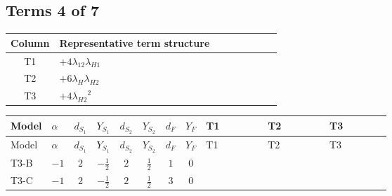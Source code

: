 \documentclass[8pt]{article}
\begin{document}
\begin{landscape}
\subsection*{Terms 4 of 7}
\begin{center}
\begin{tabular}{@{}c >{\raggedright\arraybackslash}p{0.82\linewidth}@{}}
\toprule
Column & Representative term structure \\
\midrule
T1 & \(\displaystyle +4 {\lambda_{12}} {\lambda_{H1}}\) \\
\midrule
T2 & \(\displaystyle +6 {\lambda_H} {\lambda_{H2}}\) \\
\midrule
T3 & \(\displaystyle +4 {\lambda_{H2}}^2\) \\
\midrule
\bottomrule
\end{tabular}
\end{center}
\smallskip
\tiny
\begin{longtable}{@{}llcccccc >{\raggedright\arraybackslash}p{0.21\linewidth} >{\raggedright\arraybackslash}p{0.21\linewidth} >{\raggedright\arraybackslash}p{0.21\linewidth}@{}}
\toprule
Model & $\alpha$ & $d_{S_1}$ & $Y_{S_1}$ & $d_{S_2}$ & $Y_{S_2}$ & $d_F$ & $Y_F$ & T1 & T2 & T3 \\
\midrule
\endfirsthead
\toprule
Model & $\alpha$ & $d_{S_1}$ & $Y_{S_1}$ & $d_{S_2}$ & $Y_{S_2}$ & $d_F$ & $Y_F$ & T1 & T2 & T3 \\
\midrule
\endhead
T3-B & $-1$ & $2$ & $-\frac{1}{2}$ & $2$ & $\frac{1}{2}$ & $1$ & $0$ & \scriptsize\adjustbox{max width=\linewidth}{$\begin{gathered} +4 {\lambda_{12}} {\lambda_{H1}}\end{gathered}$} & \scriptsize\adjustbox{max width=\linewidth}{$\begin{gathered} +6 {\lambda_H} {\lambda_{H2}}\end{gathered}$} & \scriptsize\adjustbox{max width=\linewidth}{$\begin{gathered} +4 {\lambda_{H2}}^2\end{gathered}$} \\
\midrule
T3-C & $-1$ & $2$ & $-\frac{1}{2}$ & $2$ & $\frac{1}{2}$ & $3$ & $0$ & \scriptsize\adjustbox{max width=\linewidth}{$\begin{gathered} +4 {\lambda_{12}} {\lambda_{H1}}\end{gathered}$} & \scriptsize\adjustbox{max width=\linewidth}{$\begin{gathered} +6 {\lambda_H} {\lambda_{H2}}\end{gathered}$} & \scriptsize\adjustbox{max width=\linewidth}{$\begin{gathered} +4 {\lambda_{H2}}^2\end{gathered}$} \\

\end{longtable}
\end{landscape}
\end{document}
